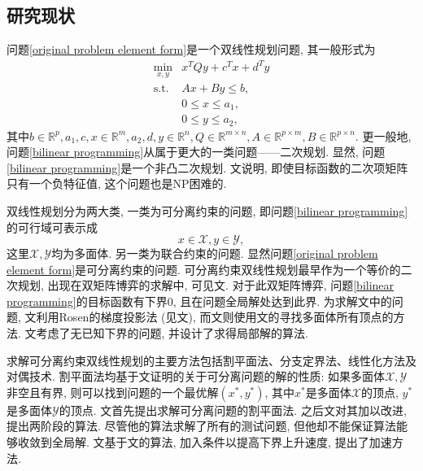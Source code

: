 \documentclass[UTF8,10.5pt,a4paper]{ctexart}
\theoremstyle{definition}
\theoremstyle{definition}
\newcommand{\st}{\mathrm{s.t.}}
\begin{document}
\subsection{研究现状}
问题\eqref{original problem element form}是一个双线性规划问题, 其一般形式为
\begin{equation}
	\begin{array}{rl}
		\min\limits_{x,y} & x^TQy+c^Tx+d^Ty\\
		\st & Ax+By\le b,\\
		 & 0\le x\le a_1,\\
		 & 0\le y\le a_2,
	\end{array}
	\label{bilinear programming}
\end{equation}
其中$b\in\mathbb{R}^p,a_1,c,x\in\mathbb{R}^{m},a_2,d,y\in\mathbb{R}^{n},Q\in\mathbb{R}^{m\times n},A\in\mathbb{R}^{p\times m},B\in\mathbb{R}^{p\times n}$. 更一般地, 问题\eqref{bilinear programming}从属于更大的一类问题——二次规划. 显然, 问题\eqref{bilinear programming}是一个非凸二次规划. 文\cite{Pardalos1991Quadratic}说明, 即使目标函数的二次项矩阵只有一个负特征值, 这个问题也是NP困难的. 
\par 双线性规划分为两大类, 一类为可分离约束的问题, 即问题\eqref{bilinear programming}的可行域可表示成
$$x\in \mathcal{X},y\in \mathcal{Y},$$这里$\mathcal{X},\mathcal{Y}$均为多面体. 另一类为联合约束的问题. 显然问题\eqref{original problem element form}是可分离约束的问题. 可分离约束双线性规划最早作为一个等价的二次规划, 出现在双矩阵博弈的求解中, 可见文\cite{Mills1960Equilibrium}. 对于此双矩阵博弈, 问题\eqref{bilinear programming}的目标函数有下界0, 且在问题全局解处达到此界. 为求解文\cite{Mills1960Equilibrium}中的问题, 文\cite{O1964Equilibrium}利用Rosen的梯度投影法 (见文\cite{Rosen1960The}), 而文\cite{MANGASARIAN1964348}则使用文\cite{Balinski1961An}的寻找多面体所有顶点的方法. 文\cite{Altman1968bilinear}考虑了无已知下界的问题, 并设计了求得局部解的算法.
\par 求解可分离约束双线性规划的主要方法包括割平面法、分支定界法、线性化方法及对偶技术. 割平面法均基于文\cite{Konno1976ACP}证明的关于可分离问题的解的性质: 如果多面体$\mathcal{X},\mathcal{Y}$非空且有界, 则可以找到问题的一个最优解$(x^*,y^*)$, 其中$x^*$是多面体$\mathcal{X}$的顶点, $y^*$是多面体$\mathcal{Y}$的顶点. 文\cite{Ritter1966}首先提出求解可分离问题的割平面法. 之后文\cite{Konno1976ACP}对其加以改进, 提出两阶段的算法. 尽管他的算法求解了所有的测试问题, 但他却不能保证算法能够收敛到全局解. 文\cite{Ding2007}基于文\cite{Konno1976ACP}的算法, 加入条件以提高下界上升速度, 提出了加速方法. 
\end{document}
